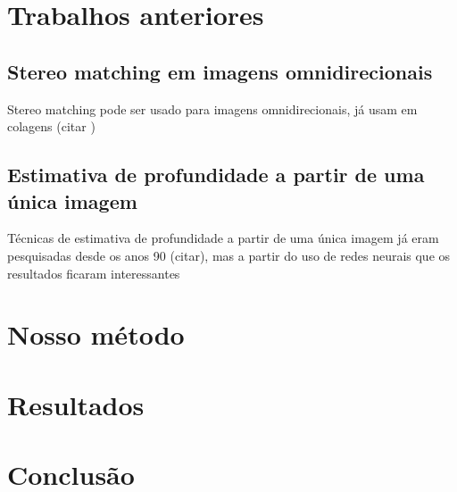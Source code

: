 \documentclass[cic,tc]{iiufrgs}
\begin{document}
\chapter{Trabalhos anteriores}

\section{Stereo matching em imagens omnidirecionais}
Stereo matching pode ser usado para imagens omnidirecionais, já usam em colagens (citar \citep{Li2001})

\section{Estimativa de profundidade a partir de uma única imagem}
Técnicas de estimativa de profundidade a partir de uma única imagem já eram pesquisadas desde os anos 90 (citar), mas a partir do uso de redes neurais que os resultados ficaram interessantes

\chapter{Nosso método}
\chapter{Resultados}
\chapter{Conclusão}

%



\end{document}
